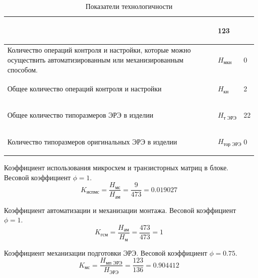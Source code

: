 \begin{table}
\begin{tabular}{|p{9cm}|p{3cm}|p{3cm}|}
        & \begin{center} 123 \end{center} \\
        \hline
        Количество операций контроля и настройки, которые можно осуществить
        автоматизированным или механизированным способом.
        & \begin{center} $H_{\text{мкн}}$ \end{center}
        & \begin{center} 0 \end{center} \\
        \hline
        Общее количество операций контроля и настройки
        & \begin{center} $H_{\text{кн}}$ \end{center}
        & \begin{center} 2 \end{center} \\
        \hline
        Общее количество типоразмеров ЭРЭ в изделии
        & \begin{center} $H_{\text{т ЭРЭ}}$ \end{center}
        & \begin{center} 22 \end{center} \\
        \hline
        Количество типоразмеров оригинальных ЭРЭ в изделии
        & \begin{center} $H_{\text{тор ЭРЭ}}$ \end{center}
        & \begin{center} 0 \end{center} \\
        \hline
    \end{tabular}
    \caption{Показатели технологичности}
    \label{technological_estaime_parametres}
\end{table}

Коэффициент использования микросхем и транзисторных матриц в блоке.
Весовой коэффициент $\phi = 1$.
$$
K_{\text{испмс}}
    = \frac{H_\text{мс}}
           {H_\text{ам}}
    = \frac{9}{473}
    = 0.019027
$$

Коэффициент автоматизации и механизации монтажа.
Весовой коэффициент $\phi = 1$.
$$
K_{\text{гсм}}
    = \frac{H_\text{ам}}
           {H_\text{м}}
    = \frac{473}{473}
    = 1
$$

Коэффициент механизации подготовки ЭРЭ.
Весовой коэффициент $\phi = 0.75$.
$$
K_{\text{мс}}
    = \frac{H_\text{мп ЭРЭ}}
           {H_\text{ЭРЭ}}
    = \frac{123}{136}
    = 0.904412
$$


